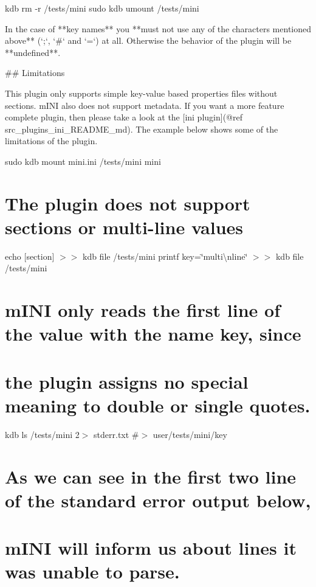 kdb rm -\/r /tests/mini sudo kdb umount /tests/mini 
\begin{DoxyCode}
In the case of **key names** you **must not use any of the characters mentioned above** (`;`, `#` and `=`)
       at all. Otherwise the behavior of the plugin will be **undefined**.

## Limitations

This plugin only supports simple key-value based properties files without sections. mINI also does not
       support metadata. If you want a more feature complete plugin, then please take a look at the [ini plugin](@ref
       src\_plugins\_ini\_README\_md). The example below shows some of the limitations of the plugin.
\end{DoxyCode}
 sudo kdb mount mini.\+ini /tests/mini mini

\section*{The plugin does not support sections or multi-\/line values}

echo \textquotesingle{}\mbox{[}section\mbox{]}\textquotesingle{} $>$$>$ {\ttfamily kdb file /tests/mini} printf \textquotesingle{}key=\char`\"{}multi\textbackslash{}nline\char`\"{}\textquotesingle{} $>$$>$ {\ttfamily kdb file /tests/mini}

\section*{m\+I\+NI only reads the first line of the value with the name {\ttfamily key}, since}

\section*{the plugin assigns no special meaning to double or single quotes.}

kdb ls /tests/mini 2$>$ stderr.\+txt \#$>$ user/tests/mini/key

\section*{As we can see in the first two line of the standard error output below,}

\section*{m\+I\+NI will inform us about lines it was unable to parse.}


